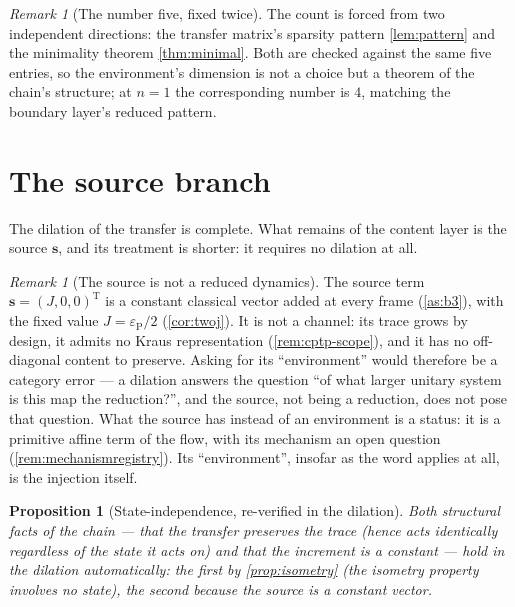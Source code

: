 \documentclass[11pt]{amsbook}
\theoremstyle{plain}
\newtheorem{proposition}[theorem]{Proposition}
\theoremstyle{definition}
\theoremstyle{remark}
\newtheorem{remark}[theorem]{Remark}
\newcommand{\uses}[1]{\par\nopagebreak\noindent{\footnotesize\emph{Uses: #1.}\par}}
\begin{document}
\begin{remark}[The number five, fixed twice]\label{rem:five}
The count is forced from two independent directions: the transfer matrix's sparsity pattern \cref{lem:pattern} and the minimality theorem \cref{thm:minimal}. Both are checked against the same five entries, so the environment's dimension is not a choice but a theorem of the chain's structure; at $n = 1$ the corresponding number is $4$, matching the boundary layer's reduced pattern.
\end{remark}

\section{The source branch}\label{sec:source-branch}

The dilation of the transfer is complete. What remains of the content layer is the source $\boldsymbol{s}$, and its treatment is shorter: it requires no dilation at all.

\begin{remark}[The source is not a reduced dynamics]\label{rem:source-no-dilation}
The source term $\boldsymbol{s} = (J, 0, 0)^{\mathrm T}$ is a constant classical vector added at every frame (\cref{as:b3}), with the fixed value $J = \varepsilon_{\mathrm P}/2$ (\cref{cor:twoj}). It is not a channel: its trace grows by design, it admits no Kraus representation (\cref{rem:cptp-scope}), and it has no off-diagonal content to preserve. Asking for its ``environment'' would therefore be a category error --- a dilation answers the question ``of what larger unitary system is this map the reduction?'', and the source, not being a reduction, does not pose that question. What the source has instead of an environment is a status: it is a primitive affine term of the flow, with its mechanism an open question (\cref{rem:mechanismregistry}). Its ``environment'', insofar as the word applies at all, is the injection itself.
\end{remark}

\begin{proposition}[State-independence, re-verified in the dilation]\label{prop:state-independence}
Both structural facts of the chain --- that the transfer preserves the trace (hence acts identically regardless of the state it acts on) and that the increment is a constant --- hold in the dilation automatically: the first by \cref{prop:isometry} (the isometry property involves no state), the second because the source is a constant vector.
\uses{\cref{prop:isometry}, \cref{as:b3}}
\end{proposition}
\end{document}
